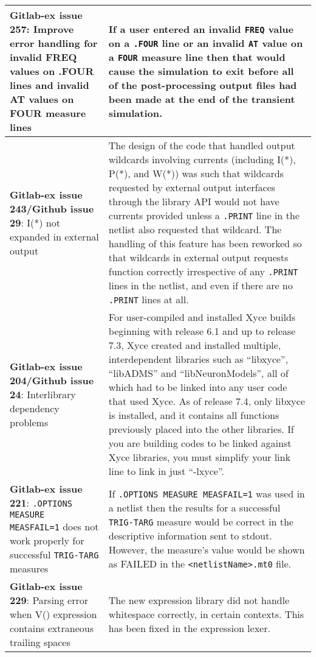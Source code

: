{\begin{longtable}[h] {>{\raggedright\small}m{2in}|>{\raggedright\let\\\tabularnewline\small}m{3.5in}}
\textbf{Gitlab-ex issue 257}: Improve error handling for invalid
FREQ values on .FOUR lines and invalid AT values on FOUR measure
lines & If a \Xyce{} user entered an invalid \texttt{FREQ} value
on a \texttt{.FOUR} line or an invalid \texttt{AT} value on a
\texttt{FOUR} measure line then that would cause the simulation
to exit before all of the post-processing output files had been
made at the end of the transient simulation. \\ \hline

\textbf{Gitlab-ex issue 243/Github issue 29}: I(*) not expanded in external output &
The design of the code that handled output wildcards involving
currents (including I(*), P(*), and W(*)) was such that wildcards
requested by external output interfaces through the library API would
not have currents provided unless a \texttt{.PRINT} line in the
netlist also requested that wildcard.  The handling of this feature
has been reworked so that wildcards in external output requests
function correctly irrespective of any \texttt{.PRINT} lines in the
netlist, and even if there are no \texttt{.PRINT} lines at
all.\\ \hline

\textbf{Gitlab-ex issue 204/Github issue 24}: Interlibrary dependency problems &
For user-compiled and installed Xyce builds beginning with release 6.1
and up to release 7.3, Xyce created and installed multiple,
interdependent libraries such as ``libxyce'', ``libADMS'' and
``libNeuronModels'', all of which had to be linked into any user code
that used Xyce.  As of release 7.4, only libxyce is installed, and it
contains all functions previously placed into the other libraries.  If
you are building codes to be linked against Xyce libraries, you must
simplify your link line to link in just ``-lxyce''.\\ \hline

  \textbf{Gitlab-ex issue 221}: \texttt{.OPTIONS MEASURE MEASFAIL=1}
does not work properly for successful \texttt{TRIG-TARG} measures &
If \texttt{.OPTIONS MEASURE MEASFAIL=1} was used in a netlist then the
results for a successful \texttt{TRIG-TARG} measure would be correct
in the descriptive information sent to stdout.  However, the measure's
value would be shown as FAILED in the \texttt{<netlistName>.mt0}
file. \\ \hline

  \textbf{Gitlab-ex issue 229}: Parsing error when V() expression
contains extraneous trailing spaces & The new expression library did
not handle whitespace correctly, in certain contexts.  This has been
fixed in the expression lexer.  \\ \hline


\end{longtable}}
